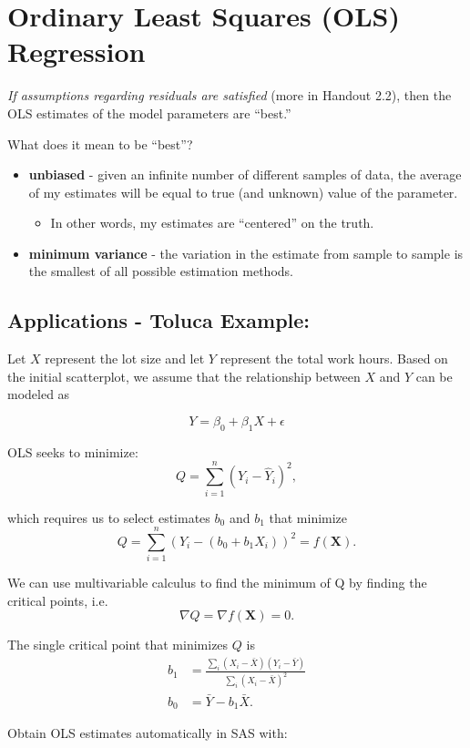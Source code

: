 \documentclass[12pt]{../notes}
\begin{document}
\section{Ordinary Least Squares (OLS) Regression}
\textit{If assumptions regarding residuals are satisfied} (more in Handout 2.2), then the OLS estimates of the model parameters are ``best.''

\nspace
What does it mean to be ``best''?
\begin{itemize}
\item \textbf{unbiased} - given an infinite number of different samples of data, the average of my estimates will be equal to true (and unknown) value of the parameter. 
\begin{itemize}
\item In other words, my estimates are ``centered'' on the truth. 
\end{itemize}
\item \textbf{minimum variance} - the variation in the estimate from sample to sample is the smallest of all possible estimation methods. 
\end{itemize}

\subsection*{Applications - Toluca Example:} 
Let $X$ represent the lot size and let $Y$ represent the total work hours. Based on the initial scatterplot, we assume that the relationship between $X$ and $Y$ can be modeled as 

\[Y = \beta_0 + \beta_1X + \epsilon\]

\nspace
OLS seeks to minimize:
\[
Q = \sum_{i=1}^n\left(Y_i - \hat{Y}_i \right)^2,
\]

which requires us to select estimates $b_0$ and $b_1$ that minimize
\[
Q = \sum_{i=1}^n\left(Y_i - \left(b_0 + b_1X_i \right) \right)^2 = f(\mathbf{X}).
\]

We can use multivariable calculus to find the minimum of Q by finding the critical points, i.e. 
\[\nabla Q = \nabla f(\mathbf{X}) = 0.\]

The single critical point that minimizes $Q$ is 
\begin{align*}
b_1 &= \frac{\sum_i (X_i - \bar{X})(Y_i - \bar{Y})}{\sum_i\left(X_i - \bar{X}\right)^2} \\
b_0 &= \bar{Y} - b_1\bar{X}.
\end{align*} 

Obtain OLS estimates automatically in SAS with:
\end{document}
